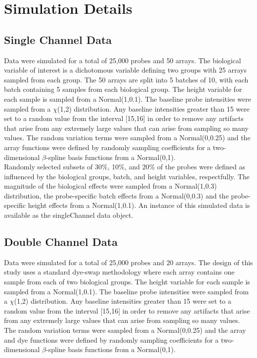 \documentclass[11pt]{article}
\begin{document}
\section{Simulation Details}\label{simDetails}
\subsection{Single Channel Data}\label{simDetailsSC}
Data were simulated for a total of 25,000 probes and 50 arrays.  The biological variable of interest is a dichotomous variable
defining two groups with 25 arrays sampled from each group.  The 50 arrays are split into 5 batches of 10, with each batch containing 
5 samples from each biological group.  The height variable for each sample is sampled from a Normal(1,0.1).  The baseline probe intensities 
were sampled from a $\chi$(1,2) distribution.  Any baseline intensities greater than 15 were set to a random value from the 
interval [15,16] in order to remove any artifacts that arise from any extremely large values that can arise from sampling so many values.  
The random variation terms were sampled from a Normal(0,0.25) and the array functions were defined by randomly sampling coefficients 
for a two-dimensional $\beta$-spline basis functions from a Normal(0,1). \\

Randomly selected subsets of 30\%, 10\%, and 20\% of the probes were defined as influenced by the biological groups, batch, and 
height variables, respectfully.  The magnitude of the biological effects were sampled from a Normal(1,0.3) distribution, the 
probe-specific batch effects from a Normal(0,0.3) and the probe-specific height effects from a Normal(1,0.1). An instance of 
this simulated data is available as the singleChannel data object.  \\

\subsection{Double Channel Data}\label{simDetailsTC}
Data were simulated for a total of 25,000 probes and 20 arrays.  The design of this study uses a standard dye-swap methodology where each array 
contains one sample from each of two biological groups. The height variable for each sample is sampled from a Normal(1,0.1).  The baseline probe intensities 
were sampled from a $\chi$(1,2) distribution.  Any baseline intensities greater than 15 were set to a random value from the 
interval [15,16] in order to remove any artifacts that arise from any extremely large values that can arise from sampling so many values.  
The random variation terms were sampled from a Normal(0,0.25) and the array and dye functions were defined by randomly sampling coefficients 
for a two-dimensional $\beta$-spline basis functions from a Normal(0,1).\\
\end{document}

